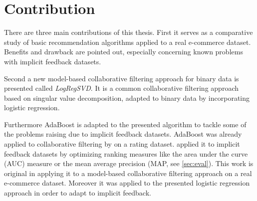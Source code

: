\documentclass[10pt]{reportMaster}
\begin{document}
\section{Contribution}
There are three main contributions of this thesis.
First it serves as a comparative study of basic recommendation algorithms applied to a real e-commerce dataset.
Benefits and drawback are pointed out, especially concerning known problems with implicit feedback datasets.

Second a new model-based collaborative filtering approach for binary data is presented called \textit{LogRegSVD}.
It is a common collaborative filtering approach based on singular value decomposition, adapted to binary data by incorporating logistic regression.

Furthermore AdaBoost is adapted to the presented algorithm to tackle some of the problems raising due to implicit feedback datasets.
AdaBoost was already applied to collaborative filtering by \cite{boostingCFRatings} on a rating dataset.
\cite{boostingAUC} applied it to implicit feedback datasets by optimizing ranking measures like the area under the curve (AUC) measure or the mean average precision (MAP, see \ref{sec:eval}).
This work is original in applying it to a model-based collaborative filtering approach on a real e-commerce dataset.
Moreover it was applied to the presented logistic regression approach in order to adapt to implicit feedback.
\end{document}
